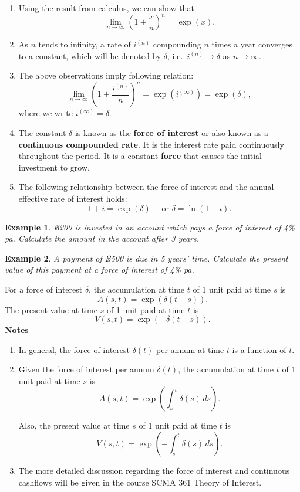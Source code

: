 \documentclass[
]{book}
\theoremstyle{definition}
\theoremstyle{definition}
\newtheorem{example}{Example}[chapter]
\theoremstyle{definition}
\theoremstyle{definition}
\theoremstyle{remark}
\begin{document}
\begin{enumerate}
\def\labelenumi{\arabic{enumi}.}
\item
  Using the result from calculus, we can show that
  \[\lim_{n \rightarrow \infty} \left(1 + \frac{x}{n} \right)^n = \exp(x).\]
\item
  As \(n\) tends to infinity, a rate of \(i^{(n)}\) compounding \(n\) times
  a year converges to a constant, which will be denoted by \(\delta\),
  i.e.~\(i^{(n)} \rightarrow \delta\) as \(n \rightarrow \infty\).
\item
  The above observations imply following relation:
  \[\lim_{n \rightarrow \infty} \left(1 + \frac{i^{(n)}}{n} \right)^n  = \exp(i^{(\infty)}) = \exp(\delta),\]
  where we write \(i^{(\infty)} = \delta\).
\item
  The constant \(\delta\) is known as the \textbf{force of interest} or also
  known as a \textbf{continuous compounded rate}. It is the interest rate
  paid continuously throughout the period. It is a constant \textbf{force}
  that causes the initial investment to grow.
\item
  The following relationship between the force of interest and the
  annual effective rate of interest holds:
  \[1 + i = \exp(\delta) \quad \text { or } \delta = \ln(1+i).\]
\end{enumerate}

\begin{example}
\emph{฿200 is invested in an account which pays a force of interest of 4\% pa.
Calculate the amount in the account after 3 years.}
\end{example}

\begin{example}
\emph{A payment of ฿500 is due in 5 years' time. Calculate the present value
of this payment at a force of interest of 4\% pa.}
\end{example}

For a force of interest \(\delta\), the accumulation at time \(t\) of 1 unit
paid at time \(s\) is \[A(s,t) = \exp( \delta (t-s)).\] The present value
at time \(s\) of 1 unit paid at time \(t\) is
\[V(s,t) = \exp( -\delta (t-s)).\] \textbf{Notes}

\begin{enumerate}
\def\labelenumi{\arabic{enumi}.}
\item
  In general, the force of interest \(\delta(t)\) per annum at time \(t\)
  is a function of \(t\).
\item
  Given the force of interest per annum \(\delta(t)\), the accumulation
  at time \(t\) of 1 unit paid at time \(s\) is
  \[A(s,t) = \exp\left( \int_{s}^t \delta(s) \, ds  \right).\]

  Also, the present value at time \(s\) of 1 unit paid at time \(t\) is
  \[V(s,t) = \exp\left(- \int_{s}^t \delta(s) \, ds  \right).\]
\item
  The more detailed discussion regarding the force of interest and
  continuous cashflows will be given in the course SCMA 361 Theory of
  Interest.
\end{enumerate}
\end{document}
